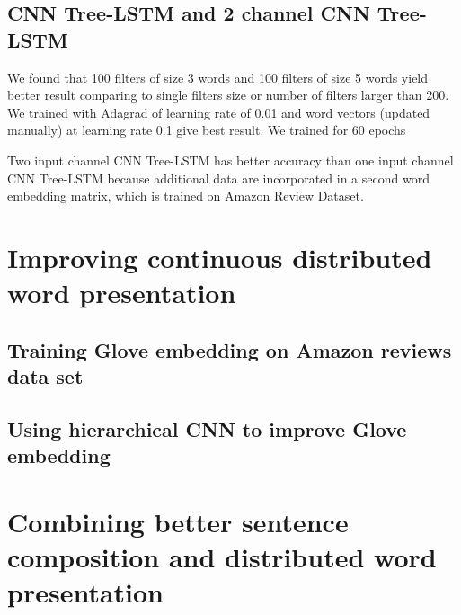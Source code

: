 \subsection{CNN Tree-LSTM and 2 channel CNN Tree-LSTM}
We found that 100 filters of size 3 words and 100 filters of size 5 words yield better result comparing to single filters size or number of filters larger than 200. We trained with Adagrad of learning rate of 0.01 and word vectors (updated manually) at learning rate 0.1 give best result. We trained for 60 epochs

Two input channel CNN Tree-LSTM has better accuracy than one input channel CNN Tree-LSTM because additional data are incorporated in a second word embedding matrix, which is trained on Amazon Review Dataset.






\section{Improving continuous distributed word presentation}

\subsection{Training Glove embedding on Amazon reviews data set}

\subsection{Using hierarchical CNN to improve Glove embedding}


\section{Combining better sentence composition and distributed word presentation}
